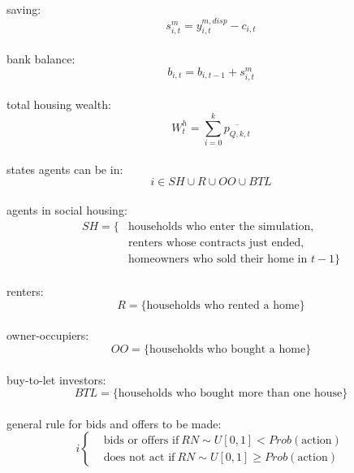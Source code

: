 \documentclass[]{article}
\begin{document}
\\
saving:
\begin{equation} \label{eq:saving}
s^{m}_{i, t}= y^{m,disp}_{i, t} - c_{i, t}
\end{equation}
\\
bank balance:
\begin{equation} \label{eq:bank_balance}
b_{i,t}= b_{i,t-1}+s^{m}_{i, t}
\end{equation}
\\
total housing wealth:
\begin{equation} \label{eq:housing wealth}
W^{h}_{t}=\sum_{i=0}^{k}\overline{p_{Q,k, t}}
\end{equation}
\\
states agents can be in:
\begin{equation}
i \in SH \cup R \cup OO \cup BTL
\end{equation}
\\
agents in social housing:
\begin{equation} \label{eq:SH}
\begin{split}
SH=\{&\text{households who enter the simulation,}\\ 
&\text{renters whose contracts just ended,} \\
&\text{homeowners who sold their home in }t-1\}
\end{split}
\end{equation}
\\
renters:
\begin{equation} \label{eq:R}
R=\{\text{households who rented a home}\}
\end{equation}
\\
owner-occupiers:
\begin{equation} \label{eq:OO}
OO=\{\text{households who bought a home}\}
\end{equation}
\\
buy-to-let investors:
\begin{equation} \label{eq:BTL}
BTL=\{\text{households who bought more than one house}\}
\end{equation}
\\
general rule for bids and offers to be made:
\begin{equation} \label{eq:bid_offer}
	i 
	\begin{cases}
	&\text{bids or offers if}~ RN \sim U[0,1] < Prob(\text{action}) \\
	&\text{does not act if}~ RN \sim U[0,1] \geq Prob(\text{action}) 
	\end{cases}
\end{equation}
\end{document}
